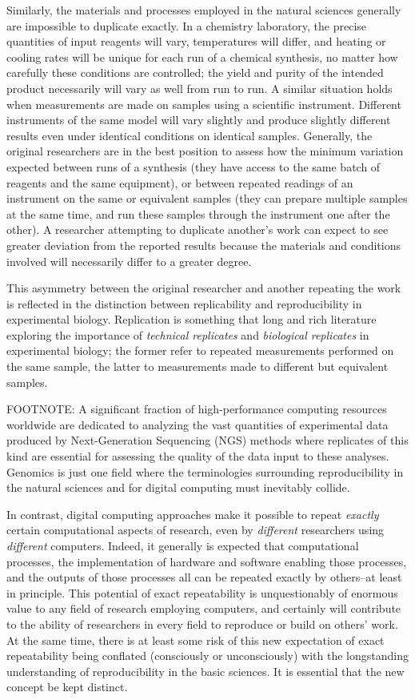Similarly, the materials and processes employed in the natural sciences generally are impossible
	to duplicate exactly.
In a chemistry laboratory, the precise quantities of input reagents will vary, temperatures will differ, and heating
	or cooling rates will be unique for each run of a chemical synthesis, no matter how carefully these conditions
	are controlled; the yield and purity of the intended product necessarily will vary as well from run to run.
A similar situation holds when measurements are made on samples using a scientific instrument. 
Different instruments of the same model will vary slightly and produce slightly different results even
	under identical conditions on identical samples.
Generally, the original researchers are in the best position to assess how the minimum variation expected
	between runs of a synthesis (they have access to the same batch of reagents and the same equipment), 
	or between repeated readings of an instrument on the same or equivalent samples (they can prepare
	multiple samples at the same time, and run these samples through the instrument one after the other).
A researcher attempting to duplicate another's work can expect to see greater deviation from the reported results	
	because the materials and conditions involved will necessarily differ to a greater degree.

This asymmetry between the original researcher and another repeating the work is reflected in the distinction
	between replicability and reproducibility in experimental biology.
Replication is something that long and rich literature
	exploring the importance of \emph{technical replicates} and \emph{biological replicates} in experimental biology;
	the former refer to repeated measurements performed on the same sample, the latter to measurements made
	to different but equivalent samples.

FOOTNOTE: A significant fraction of high-performance computing resources worldwide are dedicated to analyzing the vast quantities of
	experimental data produced by Next-Generation Sequencing (NGS) methods where replicates of this kind are essential for
	assessing the quality of the data input to these analyses. Genomics is just one field where the terminologies surrounding
	reproducibility in the natural sciences and for digital computing must inevitably collide.

In contrast, digital computing approaches make it possible to repeat \emph{exactly} certain computational aspects of research,
	 even by \emph{different} researchers using \emph{different} computers.  
Indeed, it generally is expected that computational processes, the implementation of hardware and software 
	enabling those processes, and the outputs of those processes all can be repeated exactly by others--at least in principle.
This potential of exact repeatability is unquestionably of enormous value to any field of research employing computers,
	and certainly will contribute to the ability of researchers in every field to reproduce or build on others' work.
At the same time, there is at least some risk of this new expectation of exact repeatability being conflated 
	(consciously or unconsciously) with the longstanding understanding of reproducibility in the basic sciences. 
It is essential that the new concept be kept distinct.

